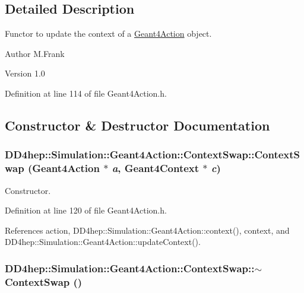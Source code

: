 \subsection{Detailed Description}
Functor to update the context of a \hyperlink{class_d_d4hep_1_1_simulation_1_1_geant4_action}{Geant4Action} object. \begin{DoxyAuthor}{Author}
M.Frank 
\end{DoxyAuthor}
\begin{DoxyVersion}{Version}
1.0 
\end{DoxyVersion}


Definition at line 114 of file Geant4Action.h.

\subsection{Constructor \& Destructor Documentation}
\hypertarget{class_d_d4hep_1_1_simulation_1_1_geant4_action_1_1_context_swap_a671e15a7c4487dea998af2e002aa78d6}{
\subsubsection[{ContextSwap}]{\setlength{\rightskip}{0pt plus 5cm}DD4hep::Simulation::Geant4Action::ContextSwap::ContextSwap ({\bf Geant4Action} $\ast$ {\em a}, \/  {\bf Geant4Context} $\ast$ {\em c})}}
\label{class_d_d4hep_1_1_simulation_1_1_geant4_action_1_1_context_swap_a671e15a7c4487dea998af2e002aa78d6}


Constructor. 

Definition at line 120 of file Geant4Action.h.

References action, DD4hep::Simulation::Geant4Action::context(), context, and DD4hep::Simulation::Geant4Action::updateContext().\hypertarget{class_d_d4hep_1_1_simulation_1_1_geant4_action_1_1_context_swap_a5f404e4ada6eb6aead85fa78d3f7b233}{
\subsubsection[{$\sim$ContextSwap}]{\setlength{\rightskip}{0pt plus 5cm}DD4hep::Simulation::Geant4Action::ContextSwap::$\sim$ContextSwap ()}}
\label{class_d_d4hep_1_1_simulation_1_1_geant4_action_1_1_context_swap_a5f404e4ada6eb6aead85fa78d3f7b233}


